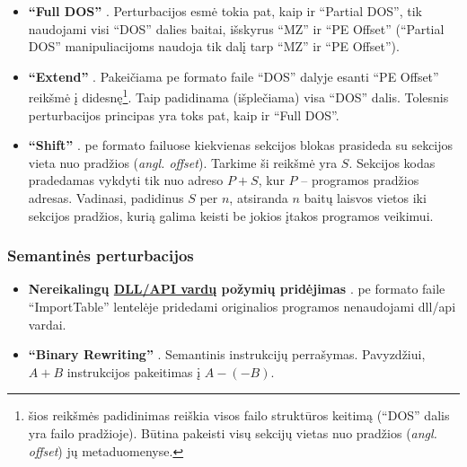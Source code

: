 \begin{itemize}
    \item \textbf{\enquote{Full DOS}} \cite{demetrioAdversarialEXEmplesSurvey2021}. Perturbacijos esmė tokia pat, kaip ir \enquote{Partial DOS}, tik naudojami visi \enquote{DOS} dalies baitai, išskyrus \enquote{MZ} ir \enquote{PE Offset} (\enquote{Partial DOS} manipuliacijoms naudoja tik dalį tarp \enquote{MZ} ir \enquote{PE Offset}).
    \item \textbf{\enquote{Extend}} \cite{demetrioAdversarialEXEmplesSurvey2021}. Pakeičiama \acs{pe} formato faile \enquote{DOS} dalyje esanti \enquote{PE Offset} reikšmė į didesnę\footnote{\label{footnote:structure}šios reikšmės padidinimas reiškia visos failo struktūros keitimą (\enquote{DOS} dalis yra failo pradžioje). Būtina pakeisti visų sekcijų vietas nuo pradžios (\textit{angl. offset}) jų metaduomenyse.}. Taip padidinama (išplečiama) visa \enquote{DOS} dalis. Tolesnis perturbacijos principas yra toks pat, kaip ir \enquote{Full DOS}.
    \item \textbf{\enquote{Shift}} \cite{demetrioAdversarialEXEmplesSurvey2021}. \acs{pe} formato failuose kiekvienas sekcijos blokas prasideda su sekcijos vieta nuo pradžios (\textit{angl. offset}). Tarkime ši reikšmė yra $S$. Sekcijos kodas pradedamas vykdyti tik nuo adreso $P+S$, kur $P$ -- programos pradžios adresas. Vadinasi, padidinus $S$ per $n$, atsiranda $n$ baitų laisvos vietos iki sekcijos pradžios, kurią galima keisti be jokios įtakos programos veikimui.
\end{itemize}
\subsubsection{Semantinės perturbacijos}
\begin{itemize}
    \item \textbf{Nereikalingų \hyperref[feature:dll]{DLL/API vardų} požymių pridėjimas} \cite{huGeneratingAdversarialMalware2017}. \acs{pe} formato faile \enquote{ImportTable} lentelėje pridedami originalios programos nenaudojami \acs{dll}/\acs{api} vardai.
    \item \textbf{\enquote{Binary Rewriting}} \cite{demetrioAdversarialEXEmplesSurvey2021}. Semantinis instrukcijų perrašymas. Pavyzdžiui, $A+B$ instrukcijos pakeitimas į $A-(-B)$.
\end{itemize}
